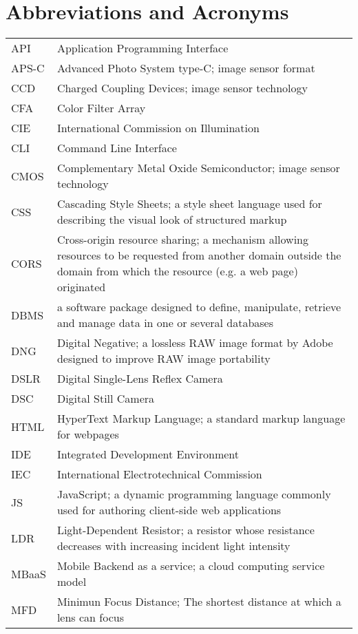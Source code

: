\documentclass[thesis.tex]{subfiles}
\begin{document}
\chapter*{Abbreviations and Acronyms}

\noindent
\begin{longtable}{@{}p{}p{}@{}}
API & Application Programming Interface \\
APS-C & Advanced Photo System type-C; image sensor format \\
CCD & Charged Coupling Devices; image sensor technology \\
CFA & Color Filter Array \\
CIE & International Commission on Illumination \\
CLI & Command Line Interface \\
CMOS & Complementary Metal Oxide Semiconductor; image sensor technology \\
CSS & Cascading Style Sheets; a style sheet language used for describing the visual look of structured markup \\
CORS & Cross-origin resource sharing; a mechanism allowing resources to be requested from another domain outside the domain from which the resource (e.g. a web page) originated \\
DBMS & a software package designed to define, manipulate, retrieve and manage data in one or several databases \\
DNG & Digital Negative; a lossless RAW image format by Adobe designed to improve RAW image portability \\
DSLR & Digital Single-Lens Reflex Camera \\
DSC & Digital Still Camera \\
HTML & HyperText Markup Language; a standard markup language for webpages \\
IDE & Integrated Development Environment \\
IEC & International Electrotechnical Commission \\
JS & JavaScript; a dynamic programming language commonly used for authoring client-side web applications \\
LDR & Light-Dependent Resistor; a resistor whose resistance decreases with increasing incident light intensity \\
MBaaS & Mobile Backend as a service; a cloud computing service model \\
MFD & Minimun Focus Distance; The shortest distance at which a lens can focus \\

\end{longtable}
\end{document}
